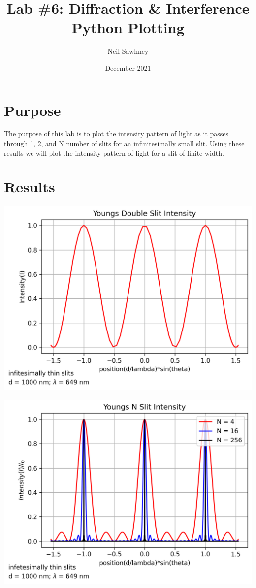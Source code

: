 \documentclass{report}
\title{Lab \#6: Diffraction \& Interference Python Plotting}
\author{Neil Sawhney}
\date{December 2021}
\begin{document}


\maketitle
\tableofcontents

\chapter{Purpose}
The purpose of this lab is to plot the intensity pattern of light as it passes through 1, 2, and N number of slits for an infinitesimally small slit. Using these results we will plot the intensity pattern of light for a slit of finite width.



\chapter{Results}

\begin{table}[H]
    \centering
    \includegraphics[width = \textwidth]{plot1.png}
\end{table}
\bigskip

\begin{table}[H]
    \centering
    \includegraphics[width = \textwidth]{plot2.png}
\end{table}
\bigskip
\end{document}
